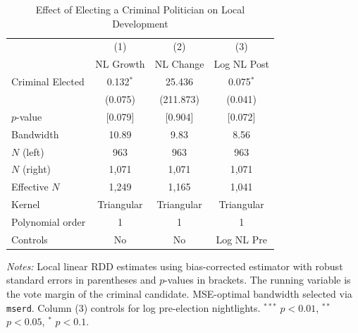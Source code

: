 \begin{table}[htbp]
\centering
\caption{Effect of Electing a Criminal Politician on Local Development}
\label{tab:main_results}
\begin{tabular}{l ccc}
\toprule
 & (1) & (2) & (3) \\
 & NL Growth & NL Change & Log NL Post \\
\midrule
Criminal Elected & 0.132$^{*}$ & 25.436 & 0.075$^{*}$ \\
  & (0.075) & (211.873) & (0.041) \\
$p$-value & [0.079] & [0.904] & [0.072] \\
\addlinespace[4pt]
Bandwidth & 10.89 & 9.83 & 8.56 \\
$N$ (left) & 963 & 963 & 963 \\
$N$ (right) & 1,071 & 1,071 & 1,071 \\
Effective $N$ & 1,249 & 1,165 & 1,041 \\
Kernel & Triangular & Triangular & Triangular \\
Polynomial order & 1 & 1 & 1 \\
Controls & No & No & Log NL Pre \\
\bottomrule
\end{tabular}
\begin{minipage}{0.92\textwidth}
\vspace{4pt}
\footnotesize
\textit{Notes:} Local linear RDD estimates using \citet{calonico2014robust} bias-corrected
estimator with robust standard errors in parentheses and $p$-values in brackets.
The running variable is the vote margin of the criminal candidate.
MSE-optimal bandwidth selected via \texttt{mserd}.
Column (3) controls for log pre-election nightlights.
$^{***}$ $p<0.01$, $^{**}$ $p<0.05$, $^{*}$ $p<0.1$.
\end{minipage}
\end{table}
